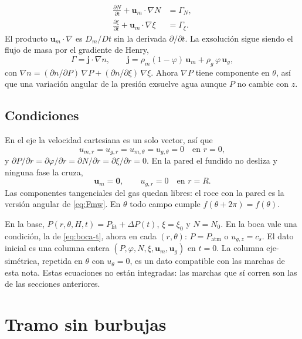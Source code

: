 \documentclass[11pt,a4paper]{article}
\newcommand{\p}{\partial}
\begin{document}
\begin{align}
\label{eq:Nxi-3d}
\frac{\p N}{\p t}+\mathbf{u}_m\cdot\nabla N
&=\Gamma_N,
\\
\frac{\p\xi}{\p t}+\mathbf{u}_m\cdot\nabla\xi
&=\Gamma_\xi.
\end{align}
El producto $\mathbf{u}_m\cdot\nabla$ es $D_m/Dt$ sin la
derivada $\p/\p t$. La exsolución sigue siendo el flujo de masa
por el gradiente de Henry,
\begin{equation}
\label{eq:Gamma-3d}
\Gamma=\mathbf{j}\cdot\nabla n,
\qquad
\mathbf{j}
=\rho_m(1-\varphi)\,\mathbf{u}_m
+\rho_g\,\varphi\,\mathbf{u}_g,
\end{equation}
con $\nabla n=(\p n/\p P)\,\nabla P+(\p n/\p\xi)\,\nabla\xi$.
Ahora $\nabla P$ tiene componente en $\theta$, así que una
variación angular de la presión exsuelve agua aunque $P$ no
cambie con $z$.

\subsection{Condiciones}

En el eje la velocidad cartesiana es un solo vector, así que
\begin{equation}
\label{eq:eje-3d}
u_{m,r}=u_{g,r}=u_{m,\theta}=u_{g,\theta}=0
\quad\text{en }r=0,
\end{equation}
y $\p P/\p r=\p\varphi/\p r=\p N/\p r=\p\xi/\p r=0$. En la pared
el fundido no desliza y ninguna fase la cruza,
\begin{equation}
\label{eq:pared-3d}
\mathbf{u}_m=\mathbf{0},
\qquad
u_{g,r}=0
\quad\text{en }r=R.
\end{equation}
Las componentes tangenciales del gas quedan libres: el roce con
la pared es la versión angular de \eqref{eq:Fmw}. En $\theta$
todo campo cumple $f(\theta+2\pi)=f(\theta)$.

En la base,
$P(r,\theta,H,t)=P_{\mathrm{lit}}+\Delta P(t)$,
$\xi=\xi_0$ y $N=N_0$. En la boca vale una condición, la de
\eqref{eq:boca-t}, ahora en cada $(r,\theta)$:
$P=P_{\mathrm{atm}}$ o $u_{g,z}=c_s$. El dato inicial es una
columna entera
$(P,\varphi,N,\xi,\mathbf{u}_m,\mathbf{u}_g)$ en $t=0$. La
columna eje-simétrica, repetida en $\theta$ con
$u_\theta=0$, es un dato compatible con las marchas de esta
nota. Estas ecuaciones no están integradas: las marchas que sí
corren son las de las secciones anteriores.

\section{Tramo sin burbujas}
\label{sec:sinbub}
\end{document}
